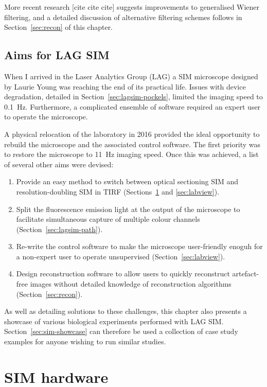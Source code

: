 More recent research [cite cite cite] suggests improvements to generalised Wiener filtering, and a detailed discussion of alternative filtering schemes follows in Section~\ref{sec:recon} of this chapter. 


\subsection{Aims for LAG SIM}
When I arrived in the Laser Analytics Group (LAG) a SIM microscope designed by Laurie Young was reaching the end of its practical life.
Issues with device degradation, detailed in Section~\ref{sec:lagsim-pockels}, limited the imaging speed to \SI{0.1}{\hertz}.
Furthermore, a complicated ensemble of software required an expert user to operate the microscope.

A physical relocation of the laboratory in 2016 provided the ideal opportunity to rebuild the microscope and the associated control software. The first priority was to restore the microscope to \SI{11}{\hertz} imaging speed. Once this was achieved, a list of several other aims were devised: 
\begin{enumerate}
	\item Provide an easy method to switch between optical sectioning SIM and resolution-doubling SIM in TIRF (Sections~\ref{sec:hardware} and \ref{sec:labview}). 
	\item Split the fluorescence emission light at the output of the microscope to facilitate simultaneous capture of multiple colour channels (Section~\ref{sec:lagsim-path}). 
	\item Re-write the control software to make the microscope user-friendly enoguh for a non-expert user to operate unsupervised (Section~\ref{sec:labview}).
	\item Design reconstruction software to allow users to quickly reconstruct artefact-free images without detailed knowledge of reconstruction algorithms (Section~\ref{sec:recon}). 
\end{enumerate}

As well as detailing solutions to these challenges, this chapter also presents a showcase of various biological experiments performed with LAG SIM. 
Section~\ref{sec:sim-showcase} can therefore be used a collection of case study examples for anyone wishing to run similar studies. 

\section{SIM hardware} \label{sec:hardware}

